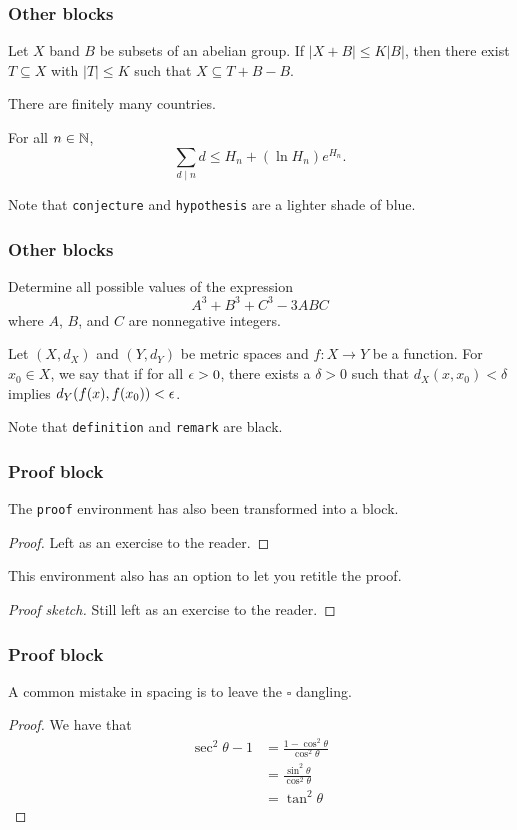 \documentclass[mathserif]{beamer}
\begin{document}
\begin{frame}\frametitle{Other blocks}
	\begin{lemma}
		Let $X$ band $B$ be subsets of an abelian group. If $|X+B|\leq K|B|$, then there exist $T\subseteq X$ with $|T|\leq K$ such that $X\subseteq T+B-B$.
	\end{lemma}
	\begin{claim}
		There are finitely many countries.
	\end{claim}
	\begin{conjecture}
		For all $n\in\operatorname{\mathbb{N}}$,
		\[
			\sum_{d\mid n}d\leq H_n+(\ln H_n)e^{H_n}.
		\]
	\end{conjecture}
	Note that \texttt{conjecture} and \texttt{hypothesis} are a lighter shade of blue.
\end{frame}

\begin{frame}\frametitle{Other blocks}
	\begin{problem}
		Determine all possible values of the expression
		\[
			A^3+B^3+C^3-3ABC
		\]
		where $A$, $B$, and $C$ are nonnegative integers.
	\end{problem}
	\begin{definition}[Continuity]
		Let $(X,d_X)$ and $(Y,d_Y)$ be metric spaces and $f\colon X\to Y$ be a function. For $x_0\in X$, we say that  if for all $\epsilon>0$, there exists a $\delta>0$ such that $d_X(x,x_0)<\delta$ implies $d_Y(f(x),f(x_0))<\epsilon$.
	\end{definition}
	Note that \texttt{definition} and \texttt{remark} are black.
\end{frame}

\begin{frame}\frametitle{Proof block}
	The \texttt{proof} environment has also been transformed into a block.
	\begin{proof}
		Left as an exercise to the reader.
	\end{proof}
	\pause
	This environment also has an option to let you retitle the proof.
	\begin{proof}[Proof sketch]
		Still left as an exercise to the reader.
	\end{proof}
\end{frame}

\begin{frame}\frametitle{Proof block}
	A common mistake in spacing is to leave the $\square$ dangling.
	\begin{proof}
		We have that
		\begin{align*}
			\sec^2\theta-1 &= \frac{1-\cos^2\theta}{\cos^2\theta} \\
			&= \frac{\sin^2\theta}{\cos^2\theta} \\
			&= \tan^2\theta
		\end{align*}
	\end{proof}
\end{frame}
\end{document}
